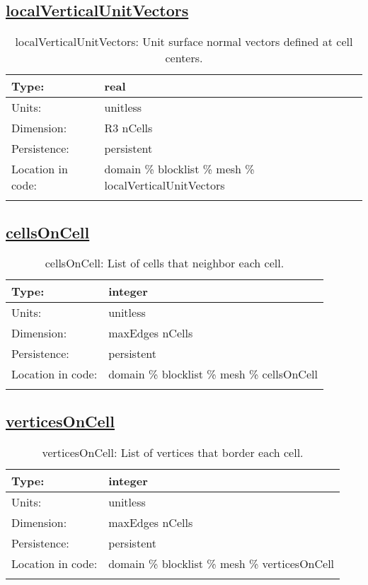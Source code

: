 \subsection[localVerticalUnitVectors]{\hyperref[sec:var_tab_mesh]{localVerticalUnitVectors}}
\label{subsec:var_sec_mesh_localVerticalUnitVectors}
\begin{center}
\begin{longtable}{| p{2.0in} | p{4.0in} |}
        \hline 
        Type: & real \\
        \hline 
        Units: & \si{unitless} \\
        \hline 
        Dimension: & R3 nCells \\
        \hline 
        Persistence: & persistent \\
        \hline 
         Location in code: & domain \% blocklist \% mesh \% localVerticalUnitVectors \\
         \hline 
    \caption{localVerticalUnitVectors: Unit surface normal vectors defined at cell centers.}
\end{longtable}
\end{center}
\subsection[cellsOnCell]{\hyperref[sec:var_tab_mesh]{cellsOnCell}}
\label{subsec:var_sec_mesh_cellsOnCell}
\begin{center}
\begin{longtable}{| p{2.0in} | p{4.0in} |}
        \hline 
        Type: & integer \\
        \hline 
        Units: & \si{unitless} \\
        \hline 
        Dimension: & maxEdges nCells \\
        \hline 
        Persistence: & persistent \\
        \hline 
         Location in code: & domain \% blocklist \% mesh \% cellsOnCell \\
         \hline 
    \caption{cellsOnCell: List of cells that neighbor each cell.}
\end{longtable}
\end{center}
\subsection[verticesOnCell]{\hyperref[sec:var_tab_mesh]{verticesOnCell}}
\label{subsec:var_sec_mesh_verticesOnCell}
\begin{center}
\begin{longtable}{| p{2.0in} | p{4.0in} |}
        \hline 
        Type: & integer \\
        \hline 
        Units: & \si{unitless} \\
        \hline 
        Dimension: & maxEdges nCells \\
        \hline 
        Persistence: & persistent \\
        \hline 
         Location in code: & domain \% blocklist \% mesh \% verticesOnCell \\
         \hline 
    \caption{verticesOnCell: List of vertices that border each cell.}
\end{longtable}
\end{center}
